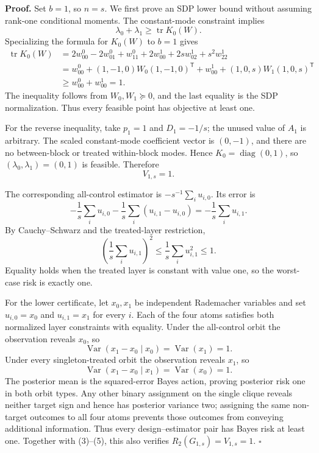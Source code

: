 \textbf{Proof.}
Set \(b=1\), so \(n=s\). We first prove an SDP lower bound without assuming rank-one conditional moments. The constant-mode constraint implies
\[
\lambda_0+\lambda_1\geq\operatorname{tr}K_0(W).
\tag{1}
\]
Specializing the formula for \(K_0(W)\) to \(b=1\) gives
\[
\begin{aligned}
\operatorname{tr}K_0(W)
&=2w^0_{00}-2w^0_{01}+w^0_{11}
  +2w^1_{00}+2sw^1_{02}+s^2w^1_{22}\\
&=w^0_{00}+(1,-1,0)W_0(1,-1,0)^{\mathsf T}
  +w^1_{00}+(1,0,s)W_1(1,0,s)^{\mathsf T}\\
&\geq w^0_{00}+w^1_{00}=1.
\end{aligned}
\tag{2}
\]
The inequality follows from \(W_0,W_1\succeq0\), and the last equality is the SDP normalization. Thus every feasible point has objective at least one.

For the reverse inequality, take \(p_1=1\) and \(D_1=-1/s\); the unused value of \(A_1\) is arbitrary. The scaled constant-mode coefficient vector is \((0,-1)\), and there are no between-block or treated within-block modes. Hence \(K_0=\operatorname{diag}(0,1)\), so \((\lambda_0,\lambda_1)=(0,1)\) is feasible. Therefore
\[
V_{1,s}=1.
\tag{3}
\]

The corresponding all-control estimator is \(-s^{-1}\sum_i u_{i,0}\). Its error is
\[
-\frac1s\sum_i u_{i,0}
-\frac1s\sum_i(u_{i,1}-u_{i,0})
=-\frac1s\sum_i u_{i,1}.
\tag{4}
\]
By Cauchy--Schwarz and the treated-layer restriction,
\[
\left(\frac1s\sum_i u_{i,1}\right)^2
\leq\frac1s\sum_i u_{i,1}^2\leq1.
\tag{5}
\]
Equality holds when the treated layer is constant with value one, so the worst-case risk is exactly one.

For the lower certificate, let \(x_0,x_1\) be independent Rademacher variables and set \(u_{i,0}=x_0\) and \(u_{i,1}=x_1\) for every \(i\). Each of the four atoms satisfies both normalized layer constraints with equality. Under the all-control orbit the observation reveals \(x_0\), so
\[
\operatorname{Var}(x_1-x_0\mid x_0)=\operatorname{Var}(x_1)=1.
\tag{6}
\]
Under every singleton-treated orbit the observation reveals \(x_1\), so
\[
\operatorname{Var}(x_1-x_0\mid x_1)=\operatorname{Var}(x_0)=1.
\tag{7}
\]
The posterior mean is the squared-error Bayes action, proving posterior risk one in both orbit types. Any other binary assignment on the single clique reveals neither target sign and hence has posterior variance two; assigning the same non-target outcomes to all four atoms prevents those outcomes from conveying additional information. Thus every design--estimator pair has Bayes risk at least one. Together with (3)--(5), this also verifies \(R_2(G_{1,s})=V_{1,s}=1\). \(\square\)
